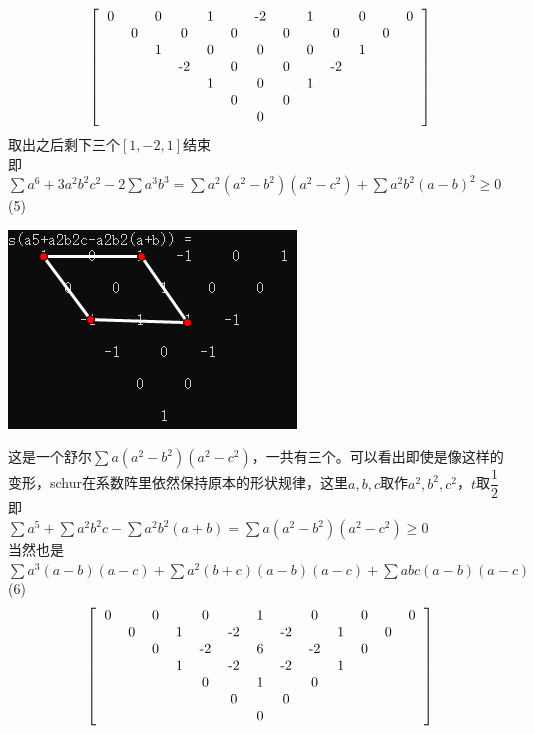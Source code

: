 \documentclass[UTF8]{ctexart}
\begin{document}
\renewcommand*{\arraystretch}{1.732}\[\left[\begin{matrix}
	\begin{tabular}{ccccccccccccc}
		0& &0& &1& &-2& &1& &0& &0\\
		&0& &0& &0& &0& &0& &0&\\
		& &1& &0& &0& &0& &1& &\\
		& & &-2& &0& &0& &-2& & &\\
		& & & &1& &0& &1& & & &\\
		& & & & &0& &0& & & & &\\
		& & & & & &0& & & & & &\\
	\end{tabular}
\end{matrix}\right]\]
取出之后剩下三个$ [1,-2,1] $结束\\
即$\displaystyle \sum   a^{6}+3 a^{2} b^{2} c^{2} -2 \displaystyle \sum   a^{3} b^{3}=\displaystyle \sum  a^{2}(a^{2}-b^{2})(a^{2}-c^{2})+\displaystyle \sum  a^{2}b^{2}(a-b)^{2}\ge 0$\\
(5)\begin{center}
	\includegraphics[width=0.5\linewidth]{0260}
\end{center}
这是一个舒尔$ \displaystyle  \sum a(a^{2}-b^{2})(a^{2}-c^{2}) $，一共有三个。可以看出即使是像这样的变形，schur在系数阵里依然保持原本的形状规律，这里$ a,b,c $取作$ a^{2},b^{2},c^{2} $，$ t $取$ \dfrac{1}{2} $即\\
$\displaystyle  \sum a^{5}+\displaystyle  \sum  a^{2} b^{2} c -\displaystyle  \sum a^{2} b^{2}(a+b)=
\displaystyle \sum  a(a^{2}-b^{2})(a^{2}-c^{2})\ge 0$ \\
当然也是$
\displaystyle \sum a^{3}(a-b)(a-c)+\displaystyle  \sum a^{2}(b+c)(a-b)(a-c)+\displaystyle  \sum abc(a-b)(a-c)$\\
(6)\renewcommand*{\arraystretch}{1.732}\[\left[\begin{matrix}
	\begin{tabular}{ccccccccccccc}
		0& &0& &0& &1& &0& &0& &0\\
		&0& &1& &-2& &-2& &1& &0&\\
		& &0& &-2& &6& &-2& &0& &\\
		& & &1& &-2& &-2& &1& & &\\
		& & & &0& &1& &0& & & &\\
		& & & & &0& &0& & & & &\\
		& & & & & &0& & & & & &\\
	\end{tabular}
\end{matrix}\right]\]
\end{document}
